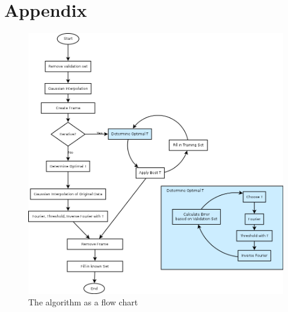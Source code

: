 \documentclass[10pt,conference,compsocconf]{IEEEtran}
\begin{document}



\clearpage
\section{Appendix}
\begin{figure}[htbp]
  \centering
  \includegraphics[width=\textwidth]{images/flowchart}
  \caption{The algorithm as a flow chart}
  \label{fig:flowchart}
\end{figure}
\end{document}
